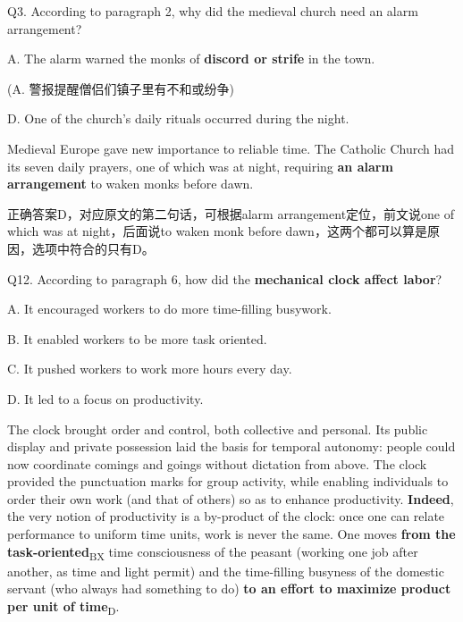 \begin{blk}
    \begin{qst}
        Q3. According to paragraph 2, why did the medieval church need an alarm arrangement?
    \end{qst}

    \begin{chc}
        A. The alarm warned the monks of \textbf{discord or strife} in the town.

        (A. 警报提醒僧侣们镇子里有不和或纷争)

        D. One of the church’s daily rituals occurred during the night.
    \end{chc}

    \begin{psgq}
        Medieval Europe gave new importance to reliable time. The Catholic Church had its seven daily prayers, one of which was at night, requiring \textbf{an alarm arrangement} to waken monks before dawn.
    \end{psgq}

    \begin{nlz}
        正确答案D，对应原文的第二句话，可根据alarm arrangement定位，前文说one of which was at night，后面说to waken monk before dawn，这两个都可以算是原因，选项中符合的只有D。
    \end{nlz}

    \begin{qst}
        Q12. According to paragraph 6, how did the \textbf{mechanical clock affect labor}?
    \end{qst}

    \begin{chc}
        A. It encouraged workers to do more time-filling busywork.

        B. It enabled workers to be more task oriented.

        C. It pushed workers to work more hours every day.

        D. It led to a focus on productivity.
    \end{chc}

    \begin{psgq}
        The clock brought order and control, both collective and personal. Its public display and private possession laid the basis for temporal autonomy: people could now coordinate comings and goings without dictation from above. The clock provided the punctuation marks for group activity, while enabling individuals to order their own work (and that of others) so as to enhance productivity. \textbf{Indeed}, the very notion of productivity is a by-product of the clock: once one can relate performance to uniform time units, work is never the same. One moves \textbf{from the task-oriented}\textsubscript{BX} time consciousness of the peasant (working one job after another, as time and light permit) and the time-filling busyness of the domestic servant (who always had something to do) \textbf{to an effort to maximize product per unit of time}\textsubscript{D}.
    \end{psgq}


\end{blk}

